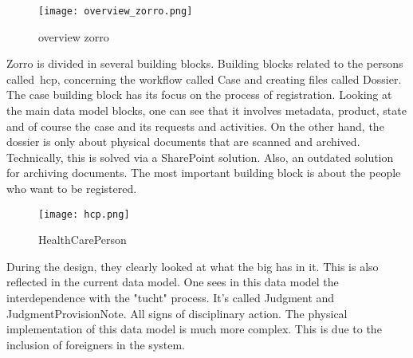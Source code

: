 \begin{wrapfigure} {r}{0.3\textwidth} 
\texttt{[image: overview\_zorro.png]}
\caption{overview zorro}
\label{fig:overview_zorro}
\end{wrapfigure}
Zorro is divided in several building blocks.
Building blocks related to the persons called~\acrfull{hcp}, concerning the workflow called Case and creating files called Dossier.
The case building block has its focus on the process of registration. 
Looking at the main data model blocks, one can see that it involves metadata, product, state and of course the case and its requests and activities.
On the other hand, the dossier is only about physical documents that are scanned and archived.
Technically, this is solved via a SharePoint solution.
Also, an outdated solution for archiving documents.
The most important building block is about the people who want to be registered.
\begin{figure}
    \centering
    \texttt{[image: hcp.png]}
    \caption{HealthCarePerson}
    \label{fig:hcp}
\end{figure}

During the design, they clearly looked at what the \acrshort{big} has in it.
This is also reflected in the current data model.
One sees in this data model the interdependence with the "tucht" process.
It's called Judgment and JudgmentProvisionNote.
All signs of disciplinary action.
The physical implementation of this data model is much more complex.
This is due to the inclusion of foreigners in the system.
